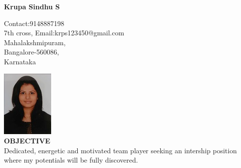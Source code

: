 \documentclass[letterpaper,11pt,oneside]{article}
\begin{document}
\begin{center}
\textbf{{\large Krupa Sindhu S}}\\
\end{center}
\vspace{-2ex}
\noindent\hrulefill
\vspace{1ex}

\small { \hfill  {Contact:9148887198}\\
	{7th cross,} \hfill  {Email:krps123450@gmail.com}\\
	{Mahalakshmipuram},\\
	{Bangalore-560086,}\\
	{Karnataka}}

 \hfill \includegraphics[scale=0.7]{krupa.jpg}\\
 
 \noindent\textbf{{\normalsize  OBJECTIVE}}\\
 \small {Dedicated, energetic and motivated team player seeking an intership position where my potentials will be fully discovered.\\}
\end{document}
